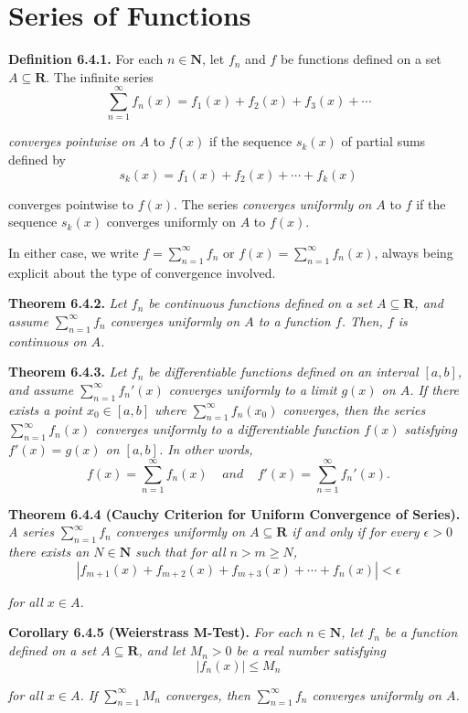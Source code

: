 \documentclass[12pt]{report}
\newcommand{\R}{\textbf{R}}
\newcommand{\N}{\textbf{N}}
\begin{document}
\section{Series of Functions}

\noindent \textbf{Definition 6.4.1.} For each $n\in\N$, let $f_n$ and $f$ be functions defined on a set $A\subseteq\R$. The infinite series
\[\sum_{n=1}^\infty f_n(x)=f_1(x)+f_2(x)+f_3(x)+\cdots\]

\noindent \textit{converges pointwise on $A$} to $f(x)$ if the sequence $s_k(x)$ of partial sums defined by
\[s_k(x)=f_1(x)+f_2(x)+\cdots+f_k(x)\]

\noindent converges pointwise to $f(x)$. The series \textit{converges uniformly on $A$} to $f$ if the sequence $s_k(x)$ converges uniformly on $A$ to $f(x)$.

In either case, we write $f=\sum_{n=1}^\infty f_n$ or $f(x)=\sum_{n=1}^\infty f_n(x)$, always being explicit about the type of convergence involved.
\bigskip

\noindent \textbf{Theorem 6.4.2.} \textit{Let $f_n$ be continuous functions defined on a set $A\subseteq\R$, and assume $\sum_{n=1}^\infty f_n$ converges uniformly on $A$ to a function $f$. Then, $f$ is continuous on $A$.}
\bigskip

\noindent \textbf{Theorem 6.4.3.} \textit{Let $f_n$ be differentiable functions defined on an interval $[a,b]$, and assume $\sum_{n=1}^\infty f_n'(x)$ converges uniformly to a limit $g(x)$ on $A$. If there exists a point $x_0\in[a,b]$ where $\sum_{n=1}^\infty f_n(x_0)$ converges, then the series $\sum_{n=1}^\infty f_n(x)$ converges uniformly to a differentiable function $f(x)$ satisfying $f'(x)=g(x)$ on $[a,b]$. In other words,}
\[f(x)=\sum_{n=1}^\infty f_n(x)\ \ \ \ \ and\ \ \ \ \ f'(x)=\sum_{n=1}^\infty f_n'(x).\]
\bigskip

\noindent \textbf{Theorem 6.4.4 (Cauchy Criterion for Uniform Convergence of Series).} \textit{A series $\sum_{n=1}^\infty f_n$ converges uniformly on $A\subseteq\R$ if and only if for every $\epsilon>0$ there exists an $N\in\N$ such that for all $n>m\geq N$,}
\[|f_{m+1}(x)+f_{m+2}(x)+f_{m+3}(x)+\cdots+f_n(x)|<\epsilon\]

\noindent \textit{for all $x\in A$.}
\bigskip

\noindent \textbf{Corollary 6.4.5 (Weierstrass M-Test).} \textit{For each $n\in\N$, let $f_n$ be a function defined on a set $A\subseteq\R$, and let $M_n>0$ be a real number satisfying}
\[|f_n(x)|\leq M_n\]

\noindent \textit{for all $x\in A$. If $\sum_{n=1}^\infty M_n$ converges, then $\sum_{n=1}^\infty f_n$ converges uniformly on $A$.}
\bigskip
\end{document}
